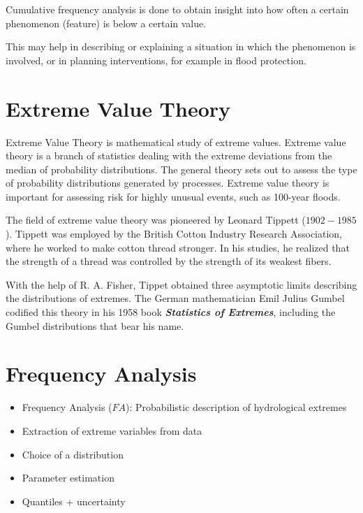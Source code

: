 \documentclass[12pt, a4paper]{article}
\theoremstyle{plain}
\theoremstyle{definition}
\theoremstyle{remark}
\begin{document}
Cumulative frequency analysis is done to obtain insight into how often a certain phenomenon (feature) is below a certain value.

This may help in describing or explaining a situation in which the phenomenon is involved, or in planning interventions, for example
in flood protection.


\section{Extreme Value Theory}
Extreme Value Theory is mathematical study of extreme values.
Extreme value theory is a branch of statistics dealing with the extreme deviations from the median of probability distributions. The general theory sets out to assess the type of probability distributions generated by processes. Extreme value theory is important for assessing risk for highly unusual events, such as 100-year floods.

The field of extreme value theory was pioneered by Leonard Tippett ($1902-1985$). Tippett was employed by the British Cotton Industry Research Association, where he worked to make cotton thread stronger. In his studies, he realized that the strength of a thread was controlled by the strength of its weakest fibers.

With the help of R. A. Fisher, Tippet obtained three asymptotic limits describing the distributions of extremes. The German mathematician Emil Julius Gumbel codified this theory in his 1958 book \textbf{\emph{Statistics of Extremes}}, including the Gumbel distributions that bear his name.
\section{Frequency Analysis}
\begin{itemize}
\item Frequency Analysis ($FA$): Probabilistic description of hydrological extremes
\item Extraction of extreme variables from data
\item Choice of a distribution
\item Parameter estimation
\item Quantiles + uncertainty
\end{itemize}
\end{document}
